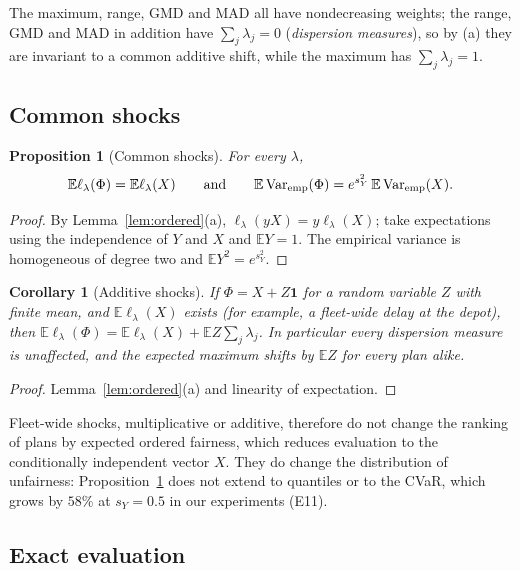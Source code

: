 \documentclass[11pt]{article}
\newtheorem{proposition}[theorem]{Proposition}
\newtheorem{corollary}[theorem]{Corollary}
\theoremstyle{definition}
\newcommand{\E}{\mathbb{E}}
\newcommand{\lord}{\ell_\lambda}
\begin{document}
The maximum, range, GMD and MAD all have nondecreasing weights; the range,
GMD and MAD in addition have $\sum_j\lambda_j=0$ (\emph{dispersion
measures}), so by (a) they are invariant to a common additive shift, while the
maximum has $\sum_j\lambda_j=1$.

\subsection{Common shocks}\label{sec:th:shocks}

\begin{proposition}[Common shocks]\label{prop:common}
For every $\lambda$,
\[
\E\lord(\Phi)=\E\lord(X)\qquad\text{and}\qquad
\E\operatorname{Var}_{\rm emp}(\Phi)=e^{s_Y^2}\,\E\operatorname{Var}_{\rm emp}(X).
\]
\end{proposition}
\begin{proof}
By Lemma~\ref{lem:ordered}(a), $\lord(yX)=y\lord(X)$; take expectations
using the independence of $Y$ and $X$ and $\E Y=1$. The empirical variance is
homogeneous of degree two and $\E Y^2=e^{s_Y^2}$.
\end{proof}

\begin{corollary}[Additive shocks]\label{cor:additive}
If $\Phi=X+Z\mathbf 1$ for a random variable $Z$ with finite mean, and
$\E\lord(X)$ exists (for example, a fleet-wide delay at the depot), then
$\E\lord(\Phi)=\E\lord(X)+\E Z\sum_j\lambda_j$. In particular every dispersion
measure is unaffected, and the expected maximum shifts by $\E Z$ for every
plan alike.
\end{corollary}
\begin{proof}
Lemma~\ref{lem:ordered}(a) and linearity of expectation.
\end{proof}

Fleet-wide shocks, multiplicative or additive, therefore do not change the
ranking of plans by expected ordered fairness, which reduces evaluation to the
conditionally independent vector $X$. They do change the distribution of
unfairness: Proposition~\ref{prop:common} does not extend to quantiles or to
the CVaR, which grows by $58\%$ at $s_Y=0.5$ in our experiments (E11).

\subsection{Exact evaluation}\label{sec:th:pboi}
\end{document}
